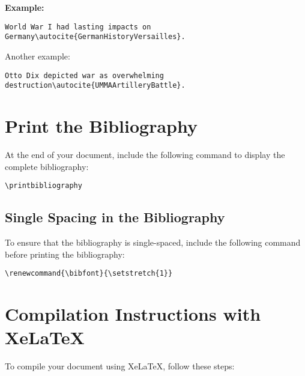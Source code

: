 \documentclass{article}
\begin{document}
\textbf{Example:}

\begin{lstlisting}
World War I had lasting impacts on Germany\autocite{GermanHistoryVersailles}.
\end{lstlisting}

Another example:

\begin{lstlisting}
Otto Dix depicted war as overwhelming destruction\autocite{UMMAArtilleryBattle}.
\end{lstlisting}

\vspace{1em}

\section{Print the Bibliography}

At the end of your document, include the following command to display the complete bibliography:

\begin{lstlisting}
\printbibliography
\end{lstlisting}

\vspace{1em}

\subsection{Single Spacing in the Bibliography}

To ensure that the bibliography is single-spaced, include the following command before printing the bibliography:

\begin{lstlisting}
\renewcommand{\bibfont}{\setstretch{1}}
\end{lstlisting}

\vspace{1em}

\section{Compilation Instructions with XeLaTeX}

To compile your document using XeLaTeX, follow these steps:
\end{document}
